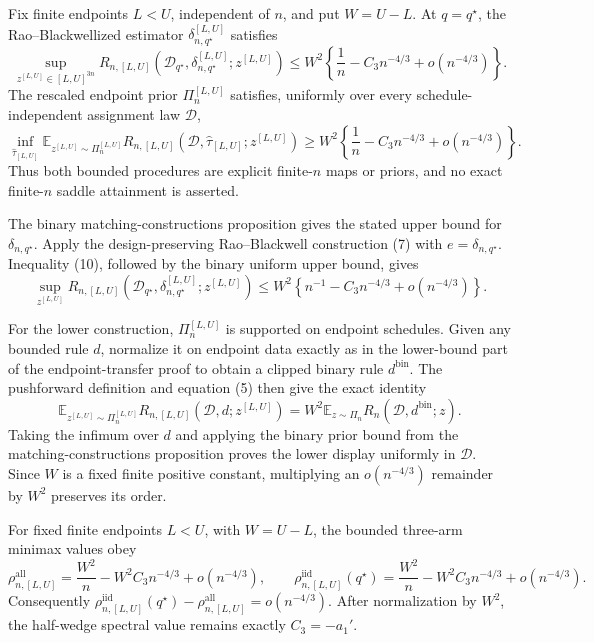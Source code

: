 Fix finite endpoints \(L<U\), independent of \(n\), and put \(W=U-L\).  At \(q=q^\star\), the Rao--Blackwellized estimator \(\delta_{n,q^\star}^{[L,U]}\) satisfies
\[
\sup_{z^{[L,U]}\in[L,U]^{3n}}
R_{n,[L,U]}(\mathcal D_{q^\star},\delta_{n,q^\star}^{[L,U]};z^{[L,U]})
\leq W^2\left\{\frac1n-C_3n^{-4/3}+o(n^{-4/3})\right\}.
\]
The rescaled endpoint prior \(\Pi_n^{[L,U]}\) satisfies, uniformly over every schedule-independent assignment law \(\mathcal D\),
\[
\inf_{\widehat\tau_{[L,U]}}
\mathbb E_{z^{[L,U]}\sim\Pi_n^{[L,U]}}
R_{n,[L,U]}(\mathcal D,\widehat\tau_{[L,U]};z^{[L,U]})
\geq W^2\left\{\frac1n-C_3n^{-4/3}+o(n^{-4/3})\right\}.
\]
Thus both bounded procedures are explicit finite-\(n\) maps or priors, and no exact finite-\(n\) saddle attainment is asserted.

The binary matching-constructions proposition gives the stated upper bound for \(\delta_{n,q^\star}\).  Apply the design-preserving Rao--Blackwell construction (7) with \(e=\delta_{n,q^\star}\).  Inequality (10), followed by the binary uniform upper bound, gives
\[
\sup_{z^{[L,U]}}R_{n,[L,U]}(\mathcal D_{q^\star},
\delta_{n,q^\star}^{[L,U]};z^{[L,U]})
\leq W^2\left\{n^{-1}-C_3n^{-4/3}+o(n^{-4/3})\right\}.
\]

For the lower construction, \(\Pi_n^{[L,U]}\) is supported on endpoint schedules.  Given any bounded rule \(d\), normalize it on endpoint data exactly as in the lower-bound part of the endpoint-transfer proof to obtain a clipped binary rule \(d^{\mathrm{bin}}\).  The pushforward definition and equation (5) then give the exact identity
\[
\mathbb E_{z^{[L,U]}\sim\Pi_n^{[L,U]}}
R_{n,[L,U]}(\mathcal D,d;z^{[L,U]})
=W^2\mathbb E_{z\sim\Pi_n}R_n(\mathcal D,d^{\mathrm{bin}};z).
\]
Taking the infimum over \(d\) and applying the binary prior bound from the matching-constructions proposition proves the lower display uniformly in \(\mathcal D\).  Since \(W\) is a fixed finite positive constant, multiplying an \(o(n^{-4/3})\) remainder by \(W^2\) preserves its order.

For fixed finite endpoints \(L<U\), with \(W=U-L\), the bounded three-arm minimax values obey
\[
\rho_{n,[L,U]}^{\mathrm{all}}
=\frac{W^2}{n}-W^2C_3n^{-4/3}+o(n^{-4/3}),
\qquad
\rho_{n,[L,U]}^{\mathrm{iid}}(q^\star)
=\frac{W^2}{n}-W^2C_3n^{-4/3}+o(n^{-4/3}).
\]
Consequently
\(\rho_{n,[L,U]}^{\mathrm{iid}}(q^\star)-\rho_{n,[L,U]}^{\mathrm{all}}=o(n^{-4/3})\).  After normalization by \(W^2\), the half-wedge spectral value remains exactly \(C_3=-a_1'\).

